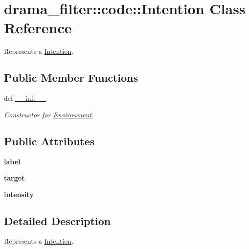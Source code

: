 \hypertarget{classdrama__filter_1_1code_1_1Intention}{
\section{drama\_\-filter::code::Intention Class Reference}
\label{classdrama__filter_1_1code_1_1Intention}
}


Represents a \hyperlink{classdrama__filter_1_1code_1_1Intention}{Intention}.  


\subsection*{Public Member Functions}
\begin{DoxyCompactItemize}
\item 
def \hyperlink{classdrama__filter_1_1code_1_1Intention_a5c94863b6f949726f9131888bf826d0a}{\_\-\_\-init\_\-\_\-}
\begin{DoxyCompactList}\small\item\em Constructor for \hyperlink{classdrama__filter_1_1code_1_1Environment}{Environment}. \end{DoxyCompactList}\end{DoxyCompactItemize}
\subsection*{Public Attributes}
\begin{DoxyCompactItemize}
\item 
\hypertarget{classdrama__filter_1_1code_1_1Intention_a2304b74e2bf6a6b8ed88bbacf4722ee8}{
{\bfseries label}}
\label{classdrama__filter_1_1code_1_1Intention_a2304b74e2bf6a6b8ed88bbacf4722ee8}

\item 
\hypertarget{classdrama__filter_1_1code_1_1Intention_a53acddad87cc13952db23bb96428758a}{
{\bfseries target}}
\label{classdrama__filter_1_1code_1_1Intention_a53acddad87cc13952db23bb96428758a}

\item 
\hypertarget{classdrama__filter_1_1code_1_1Intention_a4a23f8dd0e5c8805eab5f55ff2289b0a}{
{\bfseries intensity}}
\label{classdrama__filter_1_1code_1_1Intention_a4a23f8dd0e5c8805eab5f55ff2289b0a}

\end{DoxyCompactItemize}


\subsection{Detailed Description}
Represents a \hyperlink{classdrama__filter_1_1code_1_1Intention}{Intention}. 

